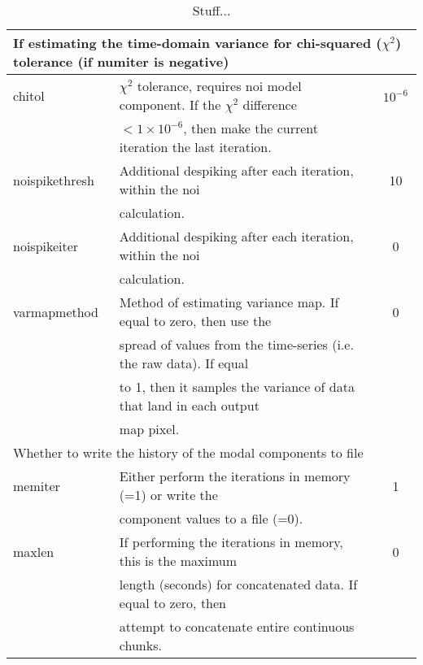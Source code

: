 \documentclass[twoside,11pt]{article}
\renewcommand{\_}{\texttt{\symbol{95}}}
\begin{document}
\begin{table}
\begin{tabular}{llc}
\hline
\multicolumn{3}{l}{If estimating the time-domain variance for chi-squared ($\chi^2$) tolerance (if numiter is negative)} \\
\hline
chitol            &   $\chi^2$ tolerance, requires noi model component. If the $\chi^2$ difference & $10^{-6}$\\
                  &   $<1\times10^{-6}$, then make the current iteration the last iteration.       & \\
noispikethresh    &   Additional despiking after each iteration, within the noi                    & 10 \\
                  &   calculation.                                                                 & \\
noispikeiter      &   Additional despiking after each iteration, within the noi                    & 0 \\
                  &   calculation.                                                                 & \\
varmapmethod      &   Method of estimating variance map. If equal to zero, then use the            & 0 \\
                  &   spread of values from the time-series (i.e. the raw data). If equal          & \\
                  &   to 1, then it samples the variance of data that land in each output          & \\
                  &   map pixel.                                                                   & \\
\hline
\multicolumn{3}{l}{Whether to write the history of the modal components to file} \\
\hline
memiter           &   Either perform the iterations in memory (=1) or write the       &    1 \\
                  &   component values to a file (=0).                                & \\
maxlen            &   If performing the iterations in memory, this is the maximum     &    0 \\
                  &   length (seconds) for concatenated data. If equal to zero, then  & \\
                  &   attempt to concatenate entire continuous chunks.                & \\
\hline
\end{tabular}
\caption{Stuff...}
\end{table}
\end{document}
